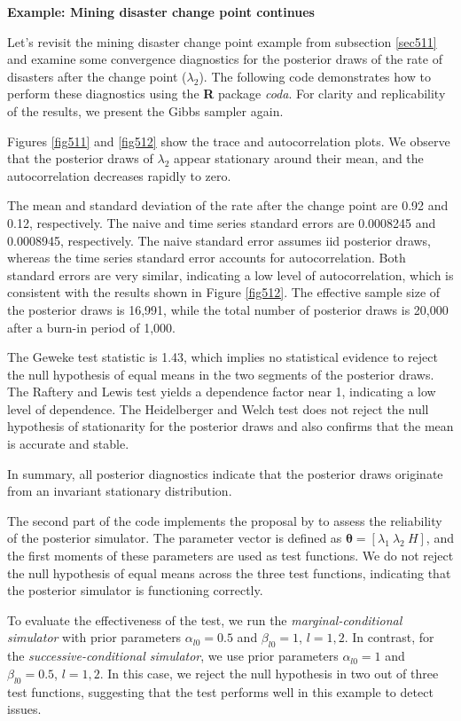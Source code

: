 \textbf{Example: Mining disaster change point continues}

Let's revisit the mining disaster change point example from subsection \ref{sec511} and examine some convergence diagnostics for the posterior draws of the rate of disasters after the change point ($\lambda_2$). The following code demonstrates how to perform these diagnostics using the \textbf{R} package \textit{coda}. For clarity and replicability of the results, we present the Gibbs sampler again.

Figures \ref{fig511} and \ref{fig512} show the trace and autocorrelation plots. We observe that the posterior draws of $\lambda_2$ appear stationary around their mean, and the autocorrelation decreases rapidly to zero.

The mean and standard deviation of the rate after the change point are 0.92 and 0.12, respectively. The naive and time series standard errors are 0.0008245 and 0.0008945, respectively. The naive standard error assumes iid posterior draws, whereas the time series standard error accounts for autocorrelation. Both standard errors are very similar, indicating a low level of autocorrelation, which is consistent with the results shown in Figure \ref{fig512}. The effective sample size of the posterior draws is 16,991, while the total number of posterior draws is 20,000 after a burn-in period of 1,000.

The Geweke test statistic is 1.43, which implies no statistical evidence to reject the null hypothesis of equal means in the two segments of the posterior draws. The Raftery and Lewis test yields a dependence factor near 1, indicating a low level of dependence. The Heidelberger and Welch test does not reject the null hypothesis of stationarity for the posterior draws and also confirms that the mean is accurate and stable.

In summary, all posterior diagnostics indicate that the posterior draws originate from an invariant stationary distribution.

The second part of the code implements the proposal by \cite{geweke2004getting} to assess the reliability of the posterior simulator. The parameter vector is defined as $\bm{\theta} = [\lambda_1 \ \lambda_2 \ H]$, and the first moments of these parameters are used as test functions. We do not reject the null hypothesis of equal means across the three test functions, indicating that the posterior simulator is functioning correctly.

To evaluate the effectiveness of the test, we run the \textit{marginal-conditional simulator} with prior parameters $\alpha_{l0} = 0.5$ and $\beta_{l0} = 1$, $l = 1, 2$. In contrast, for the \textit{successive-conditional simulator}, we use prior parameters $\alpha_{l0} = 1$ and $\beta_{l0} = 0.5$, $l = 1, 2$. In this case, we reject the null hypothesis in two out of three test functions, suggesting that the test performs well in this example to detect issues.

